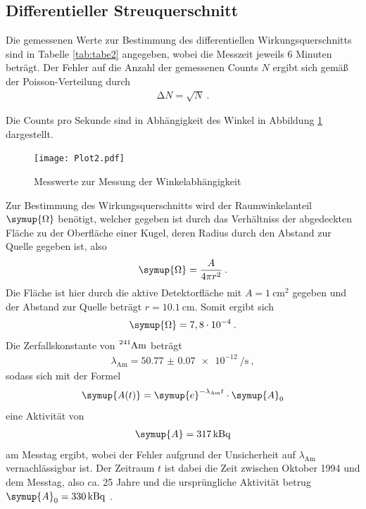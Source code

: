 \subsection{Differentieller Streuquerschnitt}
Die gemessenen Werte zur Bestimmung des differentiellen Wirkungsquerschnitts sind in
Tabelle \ref{tab:tabe2} angegeben, wobei die Messzeit jeweils 6 Minuten beträgt. Der
Fehler auf die Anzahl der gemessenen Counts $N$ ergibt sich gemäß der Poisson-Verteilung durch
\begin{align*}
  \increment N = \sqrt{N} \:.
\end{align*}

Die Counts pro Sekunde sind in Abhängigkeit des Winkel in Abbildung \ref{fig:plot2}
dargestellt.
\begin{figure}
  \centering
  \texttt{[image: Plot2.pdf]}
  \caption{Messwerte zur Messung der Winkelabhängigkeit}
  \label{fig:plot2}
\end{figure}
Zur Bestimmung des Wirkungsquerschnitts wird der Raumwinkelanteil $\symup{\Omega}$ benötigt,
welcher gegeben ist durch das Verhältniss der abgedeckten Fläche zu der Oberfläche einer Kugel, deren Radius
durch den Abstand zur Quelle gegeben ist, also
\begin{equation}
  \symup{\Omega}= \frac{A}{4\pi r^2} \:.
\end{equation}
Die Fläche ist hier durch die aktive Detektorfläche mit ${A=\SI{1}{\centi\metre\squared}}$ \cite{online5}
gegeben und der Abstand zur Quelle beträgt ${r=\SI{10.1}{\centi\metre}}$.
Somit ergibt sich
\begin{align*}
  \symup{\Omega}= 7,8\cdot10^{-4} \: .
\end{align*}
Die Zerfallskonstante von $\ce{^{241}Am}$ \cite{online3} beträgt
\begin{align*}
  \lambda_{\text{Am}}=\SI{50.77(7)e-12}{\per\second} \: ,
\end{align*}
sodass sich mit der Formel
\begin{equation}
  \symup{A(t)}=\symup{e}^{-\lambda_{\text{Am}}t}\cdot \symup{A}_0
\end{equation}
eine Aktivität von
\begin{align*}
  \symup{A}=\SI{317}{\kilo\becquerel}
\end{align*}
am Messtag ergibt, wobei der Fehler aufgrund der Unsicherheit auf $\lambda_{\text{Am}}$
vernachlässigbar ist. Der Zeitraum $t$ ist dabei die Zeit zwischen
Oktober 1994 und dem Messtag, also ca. 25 Jahre und die ursprüngliche Aktivität
betrug ${\symup{A}_0=\SI{330}{\kilo\becquerel}}$ \cite{skript}.

